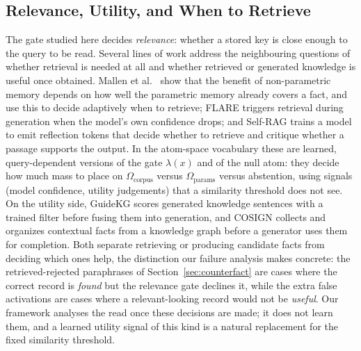 \documentclass[preprint,12pt]{elsarticle}
\newcommand{\Om}{\Omega}
\newcommand{\rev}[1]{#1}
\begin{document}
\subsection{Relevance, Utility, and When to Retrieve}
\rev{The gate studied here decides \emph{relevance}: whether a stored key is close enough to the query to be read. Several lines of work address the neighbouring questions of whether retrieval is needed at all and whether retrieved or generated knowledge is useful once obtained. Mallen et al.\ \cite{mallen2023trust} show that the benefit of non-parametric memory depends on how well the parametric memory already covers a fact, and use this to decide adaptively when to retrieve; FLARE \cite{jiang2023active} triggers retrieval during generation when the model's own confidence drops; and Self-RAG \cite{asai2024selfrag} trains a model to emit reflection tokens that decide whether to retrieve and critique whether a passage supports the output. In the atom-space vocabulary these are learned, query-dependent versions of the gate $\lambda(x)$ and of the null atom: they decide how much mass to place on $\Om_{\mathrm{corpus}}$ versus $\Om_{\mathrm{params}}$ versus abstention, using signals (model confidence, utility judgements) that a similarity threshold does not see. On the utility side, GuideKG \cite{wei2024guidekg} scores generated knowledge sentences with a trained filter before fusing them into generation, and COSIGN \cite{li2024cosign} collects and organizes contextual facts from a knowledge graph before a generator uses them for completion. Both separate retrieving or producing candidate facts from deciding which ones help, the distinction our failure analysis makes concrete: the retrieved-rejected paraphrases of Section~\ref{sec:counterfact} are cases where the correct record is \emph{found} but the relevance gate declines it, while the extra false activations are cases where a relevant-looking record would not be \emph{useful}. Our framework analyses the read once these decisions are made; it does not learn them, and a learned utility signal of this kind is a natural replacement for the fixed similarity threshold.}
\end{document}

